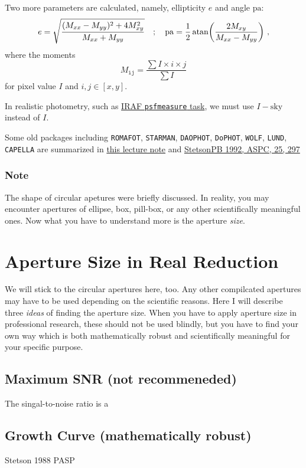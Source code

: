 Two more parameters are calculated, namely, ellipticity $ e $ and angle $ \mathrm{pa} $:
\begin{equation}
  e = \sqrt{\frac{ (M_{xx} - M_{yy})^2 + 4 M_{xy}^2}{M_{xx} + M_{yy}}}
  \quad;\quad
  \mathrm{pa}
    = \frac{1}{2} \atan(\frac{2 M_{xy}}{M_{xx} - M_{yy}}) ~,
\end{equation}
where the moments
\begin{equation}
  M_\mathtt{ij} = \frac{\sum I \times i \times j}{\sum I}
\end{equation}
for pixel value $ I $ and $ i, j \in [x, y] $. 



In realistic photometry, such as \href{https://iraf.net/irafhelp.php?val=psfmeasure&help=Help+Page}{IRAF \texttt{psfmeasure} task}, we must use $ I - \mathrm{sky} $ instead of $ I $. 

Some old packages including \texttt{ROMAFOT}, \texttt{STARMAN}, \texttt{DAOPHOT}, \texttt{DoPHOT}, \texttt{WOLF}, \texttt{LUND}, \texttt{CAPELLA} are summarized in \href{http://web.ipac.caltech.edu/staff/fmasci/home/astro_refs/WhyPSFfit.pdf}{this lecture note} and \href{https://ui.adsabs.harvard.edu/abs/1992ASPC...25..297S/abstract}{StetsonPB 1992, ASPC, 25, 297}


\subsubsection*{Note}
The shape of circular apetures were briefly discussed. In reality, you may encounter apertures of ellipse, box, pill-box, or any other scientifically meaningful ones. Now what you have to understand more is the aperture \emph{size}.

\section{Aperture Size in Real Reduction}
We will stick to the circular apertures here, too. Any other compilcated apertures may have to be used depending on the scientific reasons. Here I will describe three \emph{ideas} of finding the aperture size. When you have to apply aperture size in professional research, these should not be used blindly, but you have to find your own way which is both mathematically robust and scientifically meaningful for your specific purpose.

\subsection{Maximum SNR (not recommeneded)}
The singal-to-noise ratio is a 


\subsection{Growth Curve (mathematically robust)}
Stetson 1988 PASP






